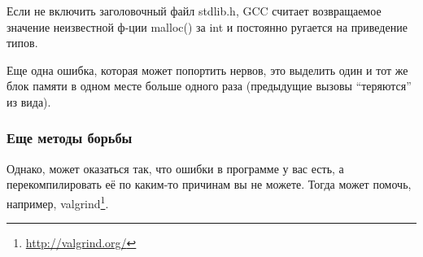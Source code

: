\subsubsection{}

Если не включить заголовочный файл stdlib.h, 
GCC считает возвращаемое значение неизвестной ф-ции malloc() за int и постоянно ругается на приведение типов.

Еще одна ошибка, которая может попортить нервов, это выделить один и тот же блок памяти в одном месте 
больше одного раза (предыдущие вызовы ``теряются'' из вида).

\subsubsection{Еще методы борьбы}

Однако, может оказаться так, что ошибки в программе у вас есть, а перекомпилировать её по каким-то причинам
вы не можете. Тогда может помочь, например, valgrind\footnote{\url{http://valgrind.org/}}.

